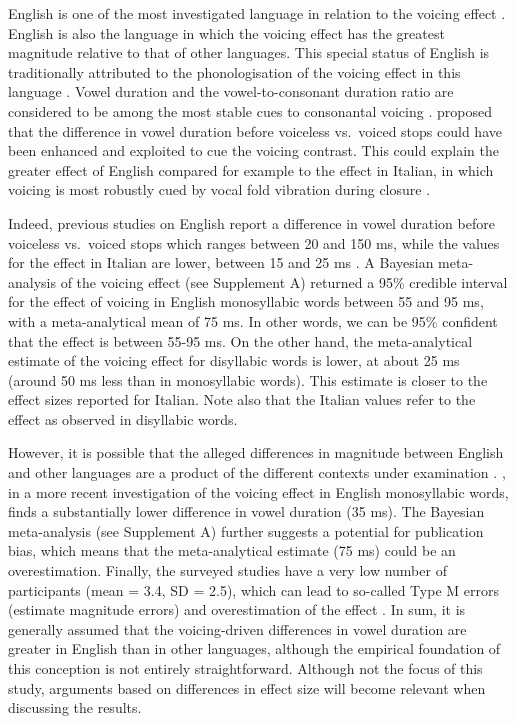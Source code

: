 \documentclass[
  12pt,
  a4paper,
]{article}
\begin{document}
English is one of the most investigated language in relation to the
voicing effect
\citep{meyer1904, heffner1937, house1953, belasco1953, peterson1960, halle1967, chen1970, klatt1973, lisker1974, laeufer1992, fowler1992, hussein1994, lampp2004, warren2005, durvasula2012, ko2018}.
English is also the language in which the voicing effect has the
greatest magnitude relative to that of other languages. This special
status of English is traditionally attributed to the phonologisation of
the voicing effect in this language \citep{sharf1964, de-jong2004}.
Vowel duration and the vowel-to-consonant duration ratio are considered
to be among the most stable cues to consonantal voicing
\citep{peterson1960, raphael1972, port1982}. \citet{kluender1988}
proposed that the difference in vowel duration before voiceless
vs.~voiced stops could have been enhanced and exploited to cue the
voicing contrast. This could explain the greater effect of English
compared for example to the effect in Italian, in which voicing is most
robustly cued by vocal fold vibration during closure \citep{pape2014}.

Indeed, previous studies on English report a difference in vowel
duration before voiceless vs.~voiced stops which ranges between 20 and
150 ms, while the values for the effect in Italian are lower, between 15
and 25 ms
\citep{caldognetto1979, farnetani1986, esposito2002, coretta2018j}. A
Bayesian meta-analysis of the voicing effect (see Supplement A) returned
a 95\% credible interval for the effect of voicing in English
monosyllabic words between 55 and 95 ms, with a meta-analytical mean of
75 ms. In other words, we can be 95\% confident that the effect is
between 55-95 ms. On the other hand, the meta-analytical estimate of the
voicing effect for disyllabic words is lower, at about 25 ms (around 50
ms less than in monosyllabic words). This estimate is closer to the
effect sizes reported for Italian. Note also that the Italian values
refer to the effect as observed in disyllabic words.

However, it is possible that the alleged differences in magnitude
between English and other languages are a product of the different
contexts under examination \citep{laeufer1992}. \citet{ko2018}, in a
more recent investigation of the voicing effect in English monosyllabic
words, finds a substantially lower difference in vowel duration (35 ms).
The Bayesian meta-analysis (see Supplement A) further suggests a
potential for publication bias, which means that the meta-analytical
estimate (75 ms) could be an overestimation. Finally, the surveyed
studies have a very low number of participants (mean = 3.4, SD = 2.5),
which can lead to so-called Type M errors (estimate magnitude errors)
and overestimation of the effect \citep{kirby2018, roettger2019}. In
sum, it is generally assumed that the voicing-driven differences in
vowel duration are greater in English than in other languages, although
the empirical foundation of this conception is not entirely
straightforward. Although not the focus of this study, arguments based
on differences in effect size will become relevant when discussing the
results.
\end{document}

